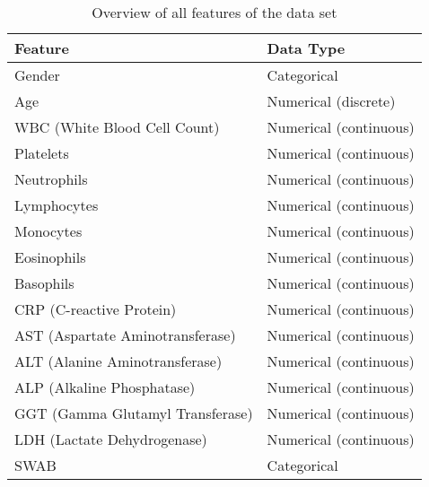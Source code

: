 \begin{table}[h]
\centering
\begin{tabular}{ll}
Feature                          & Data Type              \\ \hline
Gender                           & Categorical            \\
Age                              & Numerical (discrete)   \\
WBC (White Blood Cell Count)     & Numerical (continuous) \\
Platelets                        & Numerical (continuous) \\
Neutrophils                      & Numerical (continuous) \\
Lymphocytes                      & Numerical (continuous) \\
Monocytes                        & Numerical (continuous) \\
Eosinophils                      & Numerical (continuous) \\
Basophils                        & Numerical (continuous) \\
CRP (C-reactive Protein)         & Numerical (continuous) \\
AST (Aspartate Aminotransferase) & Numerical (continuous) \\
ALT (Alanine Aminotransferase)   & Numerical (continuous) \\
ALP (Alkaline Phosphatase)       & Numerical (continuous) \\
GGT (Gamma Glutamyl Transferase) & Numerical (continuous) \\
LDH (Lactate Dehydrogenase)      & Numerical (continuous) \\
SWAB                             & Categorical           
\end{tabular}
\caption{Overview of all features of the data set}
\label{tab:overview-features}
\end{table}

